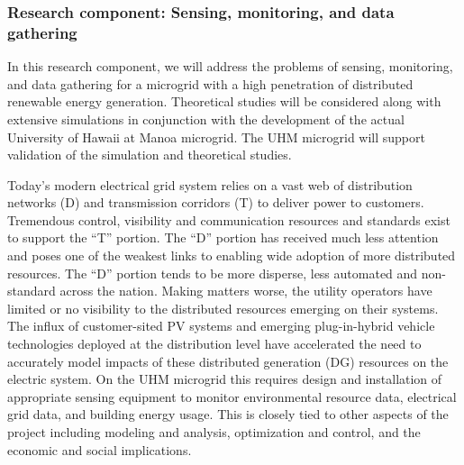 
\subsubsection{Research component: Sensing, monitoring, and data gathering}
\label{sec:sensing}

In this research component, we will address the problems of sensing,
monitoring, and data gathering for a microgrid with a high penetration of
distributed renewable energy generation.  Theoretical studies will be
considered along with extensive simulations in conjunction with the
development of the actual University of Hawaii at Manoa microgrid.  The UHM
microgrid will support validation of the simulation and
theoretical studies.

Today's modern electrical grid system relies on a vast web of distribution
networks (D) and transmission corridors (T) to deliver power to customers.
Tremendous control, visibility and communication resources and standards
exist to support the ``T'' portion.  The ``D'' portion has received much
less attention and poses one of the weakest links to enabling wide adoption
of more distributed resources.  The ``D'' portion tends to be more
disperse, less automated and non-standard across the nation.  Making
matters worse, the utility operators have limited or no visibility to the
distributed resources emerging on their systems.  The influx of
customer-sited PV systems and emerging plug-in-hybrid vehicle technologies
deployed at the distribution level have accelerated the need to accurately
model impacts of these distributed generation (DG) resources on the
electric system.  On the UHM microgrid this requires design and
installation of appropriate sensing equipment to monitor environmental
resource data, electrical grid data, and building energy usage.  This is
closely tied to other aspects of the project including modeling and
analysis, optimization and control, and the economic and social
implications.
 
